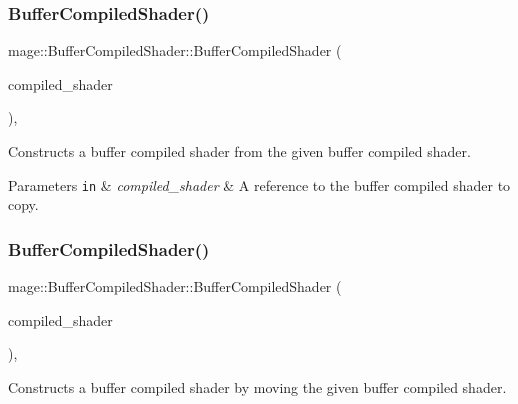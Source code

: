 \subsubsection{\texorpdfstring{Buffer\+Compiled\+Shader()}{BufferCompiledShader()}\hspace{0.1cm}{\footnotesize\ttfamily [2/3]}}
{\footnotesize\ttfamily mage\+::\+Buffer\+Compiled\+Shader\+::\+Buffer\+Compiled\+Shader (\begin{DoxyParamCaption}\item[{const \hyperlink{classmage_1_1_buffer_compiled_shader}{Buffer\+Compiled\+Shader} \&}]{compiled\+\_\+shader }\end{DoxyParamCaption})\hspace{0.3cm}{\ttfamily [default]}, {\ttfamily [noexcept]}}

Constructs a buffer compiled shader from the given buffer compiled shader.


\begin{DoxyParams}[1]{Parameters}
\mbox{\tt in}  & {\em compiled\+\_\+shader} & A reference to the buffer compiled shader to copy. \\
\hline
\end{DoxyParams}
\hypertarget{classmage_1_1_buffer_compiled_shader_ac878e7c450de7205d056b27e083adfca}{}\label{classmage_1_1_buffer_compiled_shader_ac878e7c450de7205d056b27e083adfca} 
\subsubsection{\texorpdfstring{Buffer\+Compiled\+Shader()}{BufferCompiledShader()}\hspace{0.1cm}{\footnotesize\ttfamily [3/3]}}
{\footnotesize\ttfamily mage\+::\+Buffer\+Compiled\+Shader\+::\+Buffer\+Compiled\+Shader (\begin{DoxyParamCaption}\item[{\hyperlink{classmage_1_1_buffer_compiled_shader}{Buffer\+Compiled\+Shader} \&\&}]{compiled\+\_\+shader }\end{DoxyParamCaption})\hspace{0.3cm}{\ttfamily [default]}, {\ttfamily [noexcept]}}

Constructs a buffer compiled shader by moving the given buffer compiled shader.


